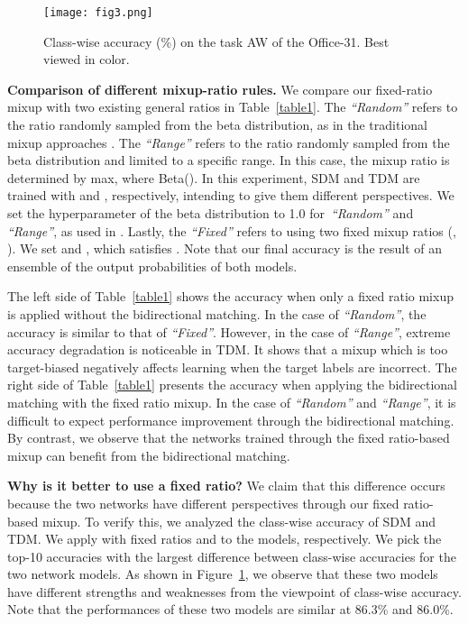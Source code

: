 \documentclass[final]{cvpr}
\begin{document}
\begin{figure}[t]
\centering
\texttt{[image: fig3.png]}
\caption{Class-wise accuracy (\%) on the task AW of the Office-31. Best viewed in color.}
\label{fig:03}
\end{figure}

\textbf{Comparison of different mixup-ratio rules.} We compare our fixed-ratio mixup with two existing general ratios in Table~\ref{table1}. The \emph{“Random”} refers to the ratio randomly sampled from the beta distribution, as in the traditional mixup approaches \cite{MixUp, MiCo2020, VMT, Minghao2020}. The \emph{“Range”} refers to the ratio randomly sampled from the beta distribution and limited to a specific range. In this case, the mixup ratio  is determined by  max, where  Beta(). In this experiment, SDM and TDM are trained with  and , respectively, intending to give them different perspectives. We set the hyperparameter  of the beta distribution to 1.0 for~\emph{“Random”} and \emph{“Range”}, as used in \cite{MiCo2020, VMT}. Lastly, the \emph{“Fixed”} refers to using two fixed mixup ratios (, ). We set  and , which satisfies . Note that our final accuracy is the result of an ensemble of the output probabilities of both models.

The left side of Table~\ref{table1} shows the accuracy when only a fixed ratio mixup is applied without the bidirectional matching. In the case of \emph{“Random”}, the accuracy is similar to that of \emph{“Fixed”}. However, in the case of \emph{“Range”}, extreme accuracy degradation is noticeable in TDM. It shows that a mixup which is too target-biased negatively affects learning when the target labels are incorrect. The right side of Table~\ref{table1} presents the accuracy when applying the bidirectional matching with the fixed ratio mixup. In the case of \emph{“Random”} and \emph{“Range”}, it is difficult to expect performance improvement through the bidirectional matching. By contrast, we observe that the networks trained through the fixed ratio-based mixup can benefit from the bidirectional matching.  

\textbf{Why is it better to use a fixed ratio?} We claim that this difference occurs because the two networks have different perspectives through our fixed ratio-based mixup. To verify this, we analyzed the class-wise accuracy of SDM and TDM. We apply  with fixed ratios  and  to the models, respectively. We pick the top-10 accuracies with the largest difference between class-wise accuracies for the two network models. As shown in Figure~\ref{fig:03}, we observe that these two models have different strengths and weaknesses from the viewpoint of class-wise accuracy. Note that the performances of these two models are similar at 86.3\% and 86.0\%.
\end{document}
